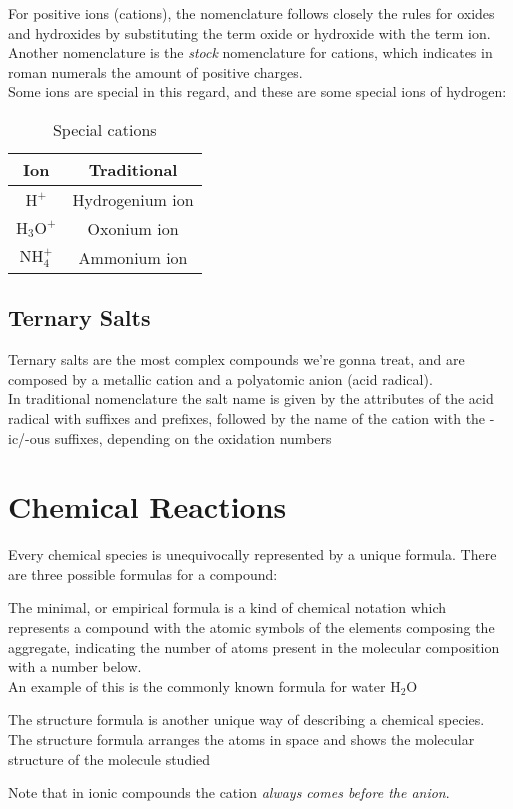 \documentclass[../qm.tex]{subfiles}
\begin{document}
For positive ions (cations), the nomenclature follows closely the rules for oxides and hydroxides by substituting the term oxide or hydroxide with the term ion. Another nomenclature is the \textit{stock} nomenclature for cations, which indicates in roman numerals the amount of positive charges.\\
Some ions are special in this regard, and these are some special ions of hydrogen:
\begin{table}[H]
	\centering
	\begin{tabular}{c|c}
		Ion&Traditional\\\hline
		$\mathrm{H^+}$&Hydrogenium ion\\\hline
		$\mathrm{H_3O^+}$&Oxonium ion\\\hline
		$\mathrm{NH_4^+}$&Ammonium ion\\\hline
	\end{tabular}
	\caption{Special cations}
	\label{tab:cationsh.chem}
\end{table}
\subsection{Ternary Salts}
Ternary salts are the most complex compounds we're gonna treat, and are composed by a metallic cation and a polyatomic anion (acid radical).\\
In traditional nomenclature the salt name is given by the attributes of the acid radical with suffixes and prefixes, followed by the name of the cation with the -ic/-ous suffixes, depending on the oxidation numbers
\section{Chemical Reactions}
Every chemical species is unequivocally represented by a unique formula. There are three possible formulas for a compound:
\begin{dfn}
	The minimal, or empirical formula is a kind of chemical notation which represents a compound with the atomic symbols of the elements composing the aggregate, indicating the number of atoms present in the molecular composition with a number below.\\
	An example of this is the commonly known formula for water $\mathrm{H_2O}$
\end{dfn}
\begin{dfn}
	The structure formula is another unique way of describing a chemical species. The structure formula arranges the atoms in space and shows the molecular structure of the molecule studied
\end{dfn}
Note that in ionic compounds the cation \textit{always comes before the anion}.
\end{document}
